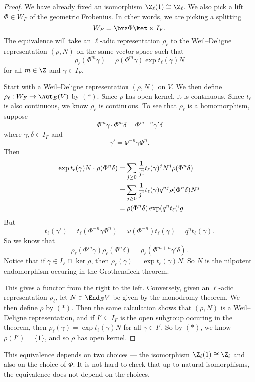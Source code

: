 \documentclass[a4paper]{article}
\begin{document}
\begin{proof}
  We have already fixed an isomorphism $\Z_\ell(1) \cong \Z_\ell$. We also pick a lift $\Phi \in W_F$ of the geometric Frobenius. In other words, we are picking a splitting
  \[
    W_F = \bra \Phi\ket \ltimes I_F.
  \]
  The equivalence will take an $\ell$-adic representation $\rho_\ell$ to the Weil--Deligne representation $(\rho, N)$ on the same vector space such that
  \[
    \rho_\ell(\Phi^m \gamma) = \rho (\Phi^m \gamma) \exp t_\ell(\gamma) N\tag{$*$}
  \]
  for all $m \in \Z$ and $\gamma \in I_F$.

  Start with a Weil--Deligne representation $(\rho, N)$ on $V$. We then define $\rho_\ell: W_F \to \Aut_E(V)$ by $(*)$. Since $\rho$ has open kernel, it is continuous. Since $t_\ell$ is also continuous, we know $\rho_\ell$ is continuous. To see that $\rho_\ell$ is a homomorphism, suppose
  \[
    \Phi^m \gamma \cdot \Phi^m \delta = \Phi^{m + n} \gamma' \delta
  \]
  where $\gamma, \delta \in I_F$ and
  \[
    \gamma' = \Phi^{-n} \gamma \Phi^n.
  \]
  Then
  \begin{align*}
    \exp t_\ell(\gamma) N \cdot \rho(\Phi^n \delta) &= \sum_{j \geq 0} \frac{1}{j!} t_\ell(\gamma)^j N^j \rho(\Phi^n \delta)\\
    &= \sum_{j \geq 0} \frac{1}{j!} t_\ell(\gamma) q^{nj} \rho(\Phi^n \delta) N^j\\
    &= \rho (\Phi^n \delta) \exp (q^n t_\ell(`g
  \end{align*}
  But
  \[
    t_\ell(\gamma') = t_\ell(\Phi^{-n} \gamma \Phi^n) = \omega(\Phi^{-n}) t_\ell(\gamma) = q^n t_\ell(\gamma).
  \]
  So we know that
  \[
    \rho_\ell(\Phi^m \gamma) \rho_\ell(\Phi^n \delta) = \rho_\ell(\Phi^{m + n} \gamma' \delta).
  \]
  Notice that if $\gamma \in I_F \cap \ker \rho$, then $\rho_\ell(\gamma) = \exp t_\ell(\gamma) N$. So $N$ is the nilpotent endomorphism occuring in the Grothendieck theorem. %

  This gives a functor from the right to the left. Conversely, given an $\ell$-adic representation $\rho_\ell$, let $N \in \End_EV$ be given by the monodromy theorem. We then define $\rho$ by $(*)$. Then the same calculation shows that $(\rho, N)$ is a Weil--Deligne representation, and if $I' \subseteq I_F$ is the open subgroup occuring in the theorem, then $\rho_\ell(\gamma) = \exp t_\ell(\gamma) N$ for all $\gamma \in I'$. So by $(*)$, we know $\rho(I') = \{1\}$, and so $\rho$ has open kernel.
\end{proof}
This equivalence depends on two choices --- the isomorphism $\Z_\ell(1) \cong \Z_\ell$ and also on the choice of $\Phi$. It is not hard to check that up to natural isomorphisms, the equivalence does not depend on the choices.
\end{document}
